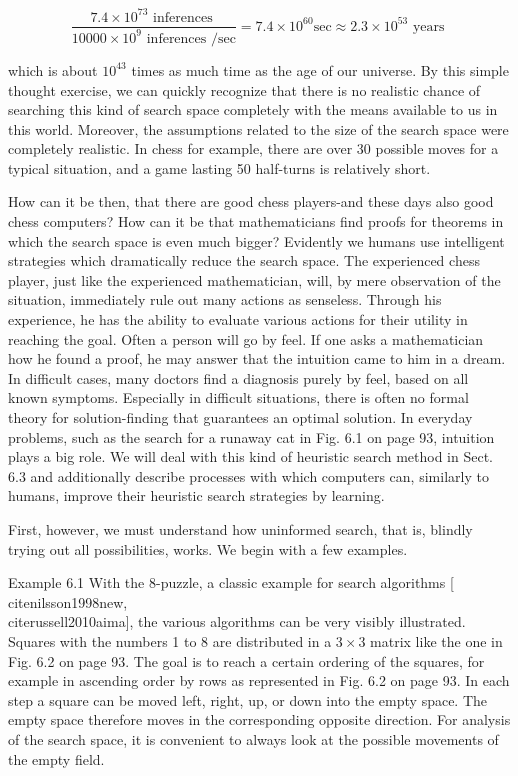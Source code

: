 \documentclass[10pt]{book}
\begin{document}
$$
\frac{7.4 \times 10^{73} \text { inferences }}{10000 \times 10^{9} \text { inferences } / \mathrm{sec}}=7.4 \times 10^{60} \mathrm{sec} \approx 2.3 \times 10^{53} \text { years }
$$

which is about $10^{43}$ times as much time as the age of our universe. By this simple thought exercise, we can quickly recognize that there is no realistic chance of searching this kind of search space completely with the means available to us in this world. Moreover, the assumptions related to the size of the search space were completely realistic. In chess for example, there are over 30 possible moves for a typical situation, and a game lasting 50 half-turns is relatively short.

How can it be then, that there are good chess players-and these days also good chess computers? How can it be that mathematicians find proofs for theorems in which the search space is even much bigger? Evidently we humans use intelligent strategies which dramatically reduce the search space. The experienced chess player, just like the experienced mathematician, will, by mere observation of the situation, immediately rule out many actions as senseless. Through his experience, he has the ability to evaluate various actions for their utility in reaching the goal. Often a person will go by feel. If one asks a mathematician how he found a proof, he may answer that the intuition came to him in a dream. In difficult cases, many doctors find a diagnosis purely by feel, based on all known symptoms. Especially in difficult situations, there is often no formal theory for solution-finding that guarantees an optimal solution. In everyday problems, such as the search for a runaway cat in Fig. 6.1 on page 93, intuition plays a big role. We will deal with this kind of heuristic search method in Sect. 6.3 and additionally describe processes with which computers can, similarly to humans, improve their heuristic search strategies by learning.

First, however, we must understand how uninformed search, that is, blindly trying out all possibilities, works. We begin with a few examples.

Example 6.1 With the 8-puzzle, a classic example for search algorithms [\\cite{nilsson1998new}, \\cite{russell2010aima}], the various algorithms can be very visibly illustrated. Squares with the numbers 1 to 8 are distributed in a $3 \times 3$ matrix like the one in Fig. 6.2 on page 93. The goal is to reach a certain ordering of the squares, for example in ascending order by rows as represented in Fig. 6.2 on page 93. In each step a square can be moved left, right, up, or down into the empty space. The empty space therefore moves in the corresponding opposite direction. For analysis of the search space, it is convenient to always look at the possible movements of the empty field.
\end{document}
